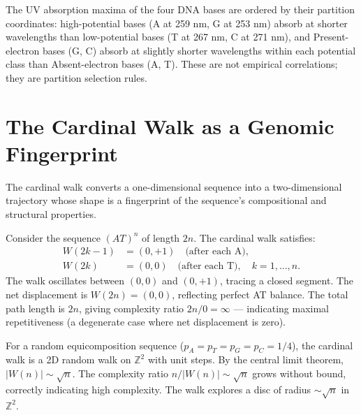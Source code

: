 \begin{keyresult}
The UV absorption maxima of the four DNA bases are ordered by their
partition coordinates: high-potential bases (A at 259 nm, G at 253 nm)
absorb at shorter wavelengths than low-potential bases (T at 267 nm,
C at 271 nm), and Present-electron bases (G, C) absorb at slightly
shorter wavelengths within each potential class than Absent-electron
bases (A, T). These are not empirical correlations; they are partition
selection rules.
\end{keyresult}

\section{The Cardinal Walk as a Genomic Fingerprint}
\label{sec:walk_fingerprint}

The cardinal walk converts a one-dimensional sequence into a
two-dimensional trajectory whose shape is a fingerprint of the
sequence's compositional and structural properties.

\begin{example}
\label{ex:repeat_walk}
Consider the sequence $(AT)^n$ of length $2n$. The cardinal walk satisfies:
\begin{align}
  W(2k-1) &= (0, +1) \quad \text{(after each A)}, \\
  W(2k)   &= (0,  0) \quad \text{(after each T)}, \quad k = 1,\ldots,n.
\end{align}
The walk oscillates between $(0,0)$ and $(0,+1)$, tracing a closed
segment. The net displacement is $W(2n) = (0,0)$, reflecting perfect
AT balance. The total path length is $2n$, giving complexity ratio
$2n/0 = \infty$ --- indicating maximal repetitiveness (a degenerate
case where net displacement is zero).
\end{example}

\begin{example}
\label{ex:random_walk}
For a random equicomposition sequence ($p_A = p_T = p_G = p_C = 1/4$),
the cardinal walk is a 2D random walk on $\mathbb{Z}^2$ with unit steps.
By the central limit theorem, $|W(n)| \sim \sqrt{n}$. The complexity
ratio $n/|W(n)| \sim \sqrt{n}$ grows without bound, correctly indicating
high complexity. The walk explores a disc of radius $\sim\sqrt{n}$ in
$\mathbb{Z}^2$.
\end{example}

